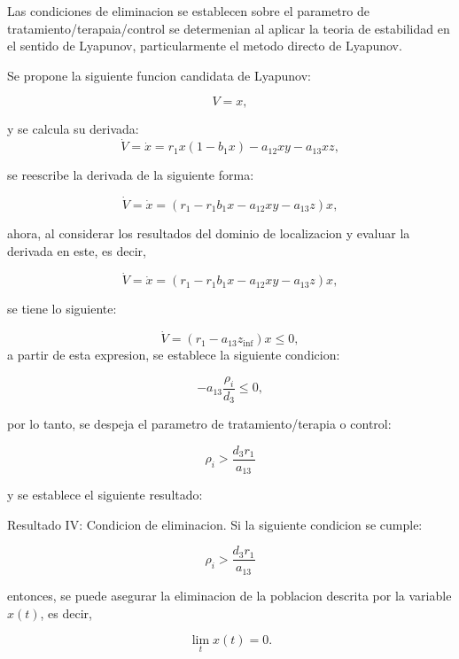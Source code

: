\documentclass[letterpaper,11pt]{article}
\begin{document}
Las condiciones de eliminacion se establecen sobre el parametro de
tratamiento/terapaia/control se determenian al aplicar la teoria de
estabilidad en el sentido de Lyapunov, particularmente el metodo directo de
Lyapunov.

Se propone la siguiente funcion candidata de Lyapunov:

\begin{equation*}
V=x,
\end{equation*}

y se calcula su derivada:%
\begin{equation*}
\dot{V}=\dot{x}=r_{1}x(1-b_{1}x)-a_{12}xy-a_{13}xz,
\end{equation*}

se reescribe la derivada de la siguiente forma:

\begin{equation*}
\dot{V}=\dot{x}=(r_{1}-r_{1}b_{1}x-a_{12}xy-a_{13}z)x,
\end{equation*}

ahora, al considerar los resultados del dominio de localizacion y evaluar la
derivada en este, es decir,

\begin{equation*}
\dot{V}=\dot{x}=(r_{1}-r_{1}b_{1}x-a_{12}xy-a_{13}z)x,
\end{equation*}

se tiene lo siguiente:

\begin{equation*}
\dot{V}=(r_{1}-a_{13}z_{\inf })x\leq 0,
\end{equation*}%
a partir de esta expresion, se establece la siguiente condicion:

\begin{equation*}
-a_{13}\frac{\rho _{i}}{d_{3}}\leq 0,
\end{equation*}

por lo tanto, se despeja el parametro de tratamiento/terapia o control:

\begin{equation*}
\rho _{i}>\frac{d_{3}r_{1}}{a_{13}}
\end{equation*}

y se establece el siguiente resultado:

\bigskip

Resultado IV: Condicion de eliminacion. Si la siguiente condicion se cumple:

\begin{equation*}
\rho _{i}>\frac{d_{3}r_{1}}{a_{13}}
\end{equation*}

entonces, se puede asegurar la eliminacion de la poblacion descrita por la
variable $x(t)$, es decir,

\begin{equation*}
\lim_{t}x(t)=0.
\end{equation*}

\bigskip
\end{document}
